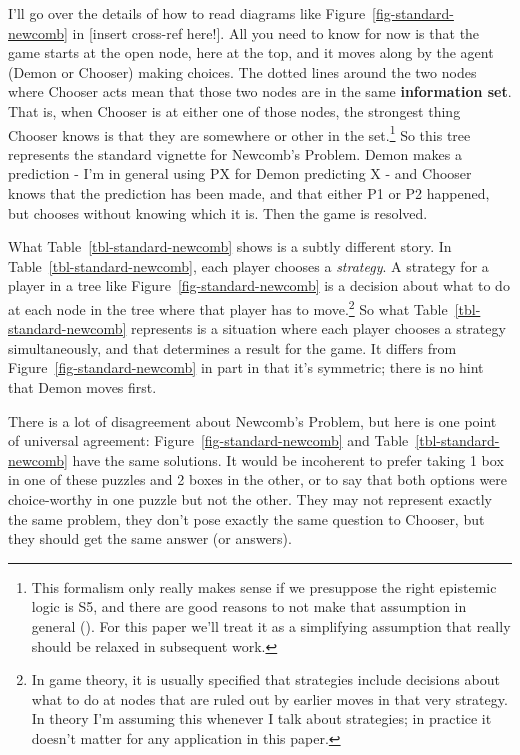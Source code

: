 \documentclass[
  10pt,
  letterpaper,
  DIV=11,
  numbers=noendperiod,
  twoside]{scrartcl}
\begin{document}
I'll go over the details of how to read diagrams like
Figure~\ref{fig-standard-newcomb} in {[}insert cross-ref here!{]}. All
you need to know for now is that the game starts at the open node, here
at the top, and it moves along by the agent (Demon or Chooser) making
choices. The dotted lines around the two nodes where Chooser acts mean
that those two nodes are in the same \textbf{information set}. That is,
when Chooser is at either one of those nodes, the strongest thing
Chooser knows is that they are somewhere or other in the set.\footnote{This
  formalism only really makes sense if we presuppose the right epistemic
  logic is S5, and there are good reasons to not make that assumption in
  general ().
  For this paper we'll treat it as a simplifying assumption that really
  should be relaxed in subsequent work.} So this tree represents the
standard vignette for Newcomb's Problem. Demon makes a prediction - I'm
in general using PX for Demon predicting X - and Chooser knows that the
prediction has been made, and that either P1 or P2 happened, but chooses
without knowing which it is. Then the game is resolved.

What Table~\ref{tbl-standard-newcomb} shows is a subtly different story.
In Table~\ref{tbl-standard-newcomb}, each player chooses a
\emph{strategy}. A strategy for a player in a tree like
Figure~\ref{fig-standard-newcomb} is a decision about what to do at each
node in the tree where that player has to move.\footnote{In game theory,
  it is usually specified that strategies include decisions about what
  to do at nodes that are ruled out by earlier moves in that very
  strategy. In theory I'm assuming this whenever I talk about
  strategies; in practice it doesn't matter for any application in this
  paper.} So what Table~\ref{tbl-standard-newcomb} represents is a
situation where each player chooses a strategy simultaneously, and that
determines a result for the game. It differs from
Figure~\ref{fig-standard-newcomb} in part in that it's symmetric; there
is no hint that Demon moves first.

There is a lot of disagreement about Newcomb's Problem, but here is one
point of universal agreement: Figure~\ref{fig-standard-newcomb} and
Table~\ref{tbl-standard-newcomb} have the same solutions. It would be
incoherent to prefer taking 1 box in one of these puzzles and 2 boxes in
the other, or to say that both options were choice-worthy in one puzzle
but not the other. They may not represent exactly the same problem, they
don't pose exactly the same question to Chooser, but they should get the
same answer (or answers).
\end{document}
